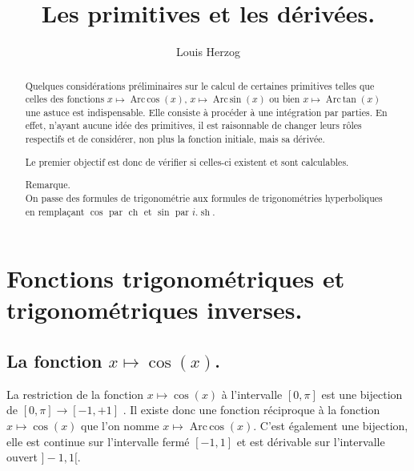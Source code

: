 \documentclass[a4paper,14pt]{extreport} %
\newcommand{\sommaire}{\shorttoc{Sommaire}{1}}
\renewcommand{\sinh}{\mathop{\mathrm{sh}}}
\renewcommand{\cosh}{\mathop{\mathrm{ch}}}
\renewcommand{\arcsin}{\mathop{\mathrm{Arc\,sin}}}
\renewcommand{\arccos}{\mathop{\mathrm{Arc\,cos}}}
\renewcommand{\arctan}{\mathop{\mathrm{Arc\,tan}}}
\begin{document}
 


\setlength{\parindent}{0pt}



\title{Les primitives et les dérivées.}
\date{}


\author{Louis Herzog} 

\maketitle 

\setcounter{tocdepth}{2}
\tableofcontents


\begin{abstract}
Quelques considérations préliminaires sur le calcul de certaines primitives telles que celles des fonctions 
 $x \mapsto \arccos(x) $,  $x \mapsto \arcsin(x) $ ou bien $x \mapsto \arctan(x) $ une astuce est indispensable. Elle consiste à procéder à une intégration par parties. En effet, n'ayant aucune idée des primitives, il est raisonnable de changer leurs rôles respectifs et de considérer, non plus la fonction initiale, mais sa dérivée.
 
Le premier objectif est donc de vérifier si celles-ci existent et sont calculables.

Remarque.\\
On passe des formules de trigonométrie aux formules de trigonométries hyperboliques en remplaçant $\cos$ par $\cosh$ et $\sin$ par $i . \sinh$.


\end{abstract} 

\chapter{Fonctions trigonométriques et trigonométriques inverses.}


\section{La fonction  $x \mapsto \cos(x)$.}

La restriction de la fonction $x \mapsto \cos(x) $ à l'intervalle $[0,\pi]$ est une bijection de $[0,\pi] \rightarrow [-1,+1]$ . Il existe donc une fonction réciproque à la fonction $x \mapsto \cos(x) $ que l'on nomme $x \mapsto \arccos(x) $. C'est également une bijection, elle est continue sur l'intervalle fermé  $ [-1,1]$ et est dérivable sur l'intervalle ouvert $ ]-1,1[$.
\end{document}
